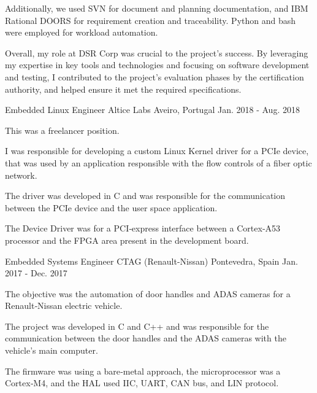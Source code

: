 \begin{cventries}
{\begin{cvitems}
        \item {Additionally, we used SVN for document and planning documentation, and IBM Rational DOORS for requirement creation and traceability. Python and bash were employed for workload automation.}
        \item {Overall, my role at DSR Corp was crucial to the project’s success. By leveraging my expertise in key tools and technologies and focusing on software development and testing, I contributed to the project’s evaluation phases by the certification authority, and helped ensure it met the required specifications.}
      \end{cvitems}
    }

  \cventry
    {Embedded Linux Engineer} %
    {Altice Labs} %
    {Aveiro, Portugal} %
    {Jan. 2018 - Aug. 2018} %
    {
      \begin{cvitems} %
        \item {This was a freelancer position.}
        \item {I was responsible for developing a custom Linux Kernel driver for a PCIe device, that was used by an application responsible with the flow controls of a fiber optic network.}
        \item {The driver was developed in C and was responsible for the communication between the PCIe device and the user space application.}
        \item {The Device Driver was for a PCI‑express interface between a Cortex‑A53 processor and the FPGA area present in the development board.}
      \end{cvitems}
    }

  \cventry
    {Embedded Systems Engineer} %
    {CTAG (Renault-Nissan)} %
    {Pontevedra, Spain} %
    {Jan. 2017 - Dec. 2017} %
    {
      \begin{cvitems} %
        \item {The objective was the automation of door handles and ADAS cameras for a Renault‑Nissan electric vehicle.}
        \item {The project was developed in C and C++ and was responsible for the communication between the door handles and the ADAS cameras with the vehicle's main computer.}
        \item {The firmware was using a bare‑metal approach, the microprocessor was a Cortex‑M4, and the HAL used IIC, UART, CAN bus, and LIN protocol.}
      \end{cvitems}
    }


\end{cventries}
